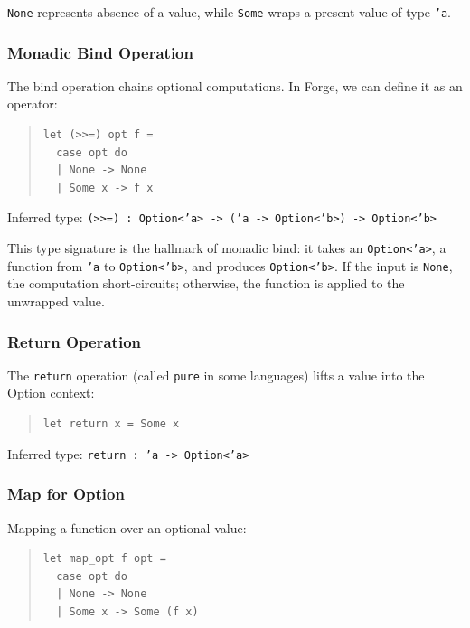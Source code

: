 \documentclass[conference,onecolumn]{IEEEtran}
\begin{document}
\texttt{None} represents absence of a value, while \texttt{Some} wraps a present value of type \texttt{'a}.

\subsubsection{Monadic Bind Operation}

The bind operation chains optional computations. In Forge, we can define it as an operator:

\begin{quote}
\small
\begin{verbatim}
let (>>=) opt f =
  case opt do
  | None -> None
  | Some x -> f x
\end{verbatim}
\end{quote}

Inferred type: \texttt{(>>=) : Option<'a> -> ('a -> Option<'b>) -> Option<'b>}

This type signature is the hallmark of monadic bind: it takes an \texttt{Option<'a>}, a function from \texttt{'a} to \texttt{Option<'b>}, and produces \texttt{Option<'b>}. If the input is \texttt{None}, the computation short-circuits; otherwise, the function is applied to the unwrapped value.

\subsubsection{Return Operation}

The \texttt{return} operation (called \texttt{pure} in some languages) lifts a value into the Option context:

\begin{quote}
\small
\begin{verbatim}
let return x = Some x
\end{verbatim}
\end{quote}

Inferred type: \texttt{return : 'a -> Option<'a>}

\subsubsection{Map for Option}

Mapping a function over an optional value:

\begin{quote}
\small
\begin{verbatim}
let map_opt f opt =
  case opt do
  | None -> None
  | Some x -> Some (f x)
\end{verbatim}
\end{quote}
\end{document}
